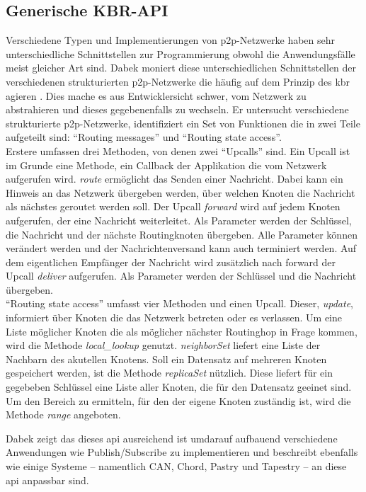 \subsection{Generische KBR-API}
\label{chap:grundlagen:api}
Verschiedene Typen und Implementierungen von p2p-Netzwerke haben sehr unterschiedliche Schnittstellen zur Programmierung obwohl die Anwendungsfälle meist gleicher Art sind. Dabek moniert diese unterschiedlichen Schnittstellen der verschiedenen strukturierten p2p-Netzwerke die häufig auf dem Prinzip des \ac{kbr} agieren \cite{Dabek2003Towards}. Dies mache es aus Entwicklersicht schwer, vom Netzwerk zu abstrahieren und dieses gegebenenfalls zu wechseln. Er untersucht verschiedene strukturierte p2p-Netzwerke, identifiziert ein Set von Funktionen die in zwei Teile aufgeteilt sind: ``Routing messages'' und ``Routing state access''.\\
Erstere umfassen drei Methoden, von denen zwei ``Upcalls'' sind. Ein Upcall ist im Grunde eine Methode, ein Callback der Applikation die vom Netzwerk aufgerufen wird. \emph{route} ermöglicht das Senden einer Nachricht. Dabei kann ein Hinweis an das Netzwerk übergeben werden, über welchen Knoten die Nachricht als nächstes geroutet werden soll. Der Upcall \emph{forward} wird auf jedem Knoten aufgerufen, der eine Nachricht weiterleitet. Als Parameter werden der Schlüssel, die Nachricht und der nächste Routingknoten übergeben. Alle Parameter können verändert werden und der Nachrichtenversand kann auch terminiert werden. Auf dem eigentlichen Empfänger der Nachricht wird zusätzlich nach forward der Upcall \emph{deliver} aufgerufen. Als Parameter werden der Schlüssel und die Nachricht übergeben.\\
``Routing state access'' umfasst vier Methoden und einen Upcall. Dieser, \emph{update}, informiert über Knoten die das Netzwerk betreten oder es verlassen. Um eine Liste möglicher Knoten die als möglicher nächster Routinghop in Frage kommen, wird die Methode \emph{local\_lookup} genutzt. \emph{neighborSet} liefert eine Liste der Nachbarn des akutellen Knotens. Soll ein Datensatz auf mehreren Knoten gespeichert werden, ist die Methode \emph{replicaSet} nützlich. Diese liefert für ein gegebeben Schlüssel eine Liste aller Knoten, die für den Datensatz geeinet sind. Um den Bereich zu ermitteln, für den der eigene Knoten zuständig ist, wird die Methode \emph{range} angeboten.

Dabek zeigt das dieses \acf{api} ausreichend ist umdarauf aufbauend verschiedene Anwendungen wie Publish/Subscribe zu implementieren und beschreibt ebenfalls wie einige Systeme -- namentlich CAN, Chord, Pastry und Tapestry -- an diese \ac{api} anpassbar sind.
